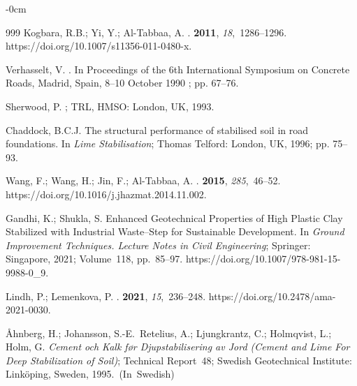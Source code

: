 \documentclass[materials,article,accept,pdftex,moreauthors]{Definitions/mdpi}
\begin{document}
\begin{adjustwidth}{-\extralength}{0cm}
\begin{thebibliography}{999}
Kogbara, R.B.; Yi, Y.; Al-Tabbaa, A.
.
 {\bf 2011}, {\em
  18},~1286--1296. https://doi.org/10.1007/s11356-011-0480-x.

{Verhasselt, V.} 
.
\newblock  In Proceedings of the 6th International Symposium on Concrete Roads, {Madrid, Spain}, {8--10 October 1990}
; pp. 67--76.

Sherwood, P.
; TRL, HMSO: London, UK,
   1993.

Chaddock, B.C.J. {The structural performance of stabilised soil in road
  foundations}.
\newblock In {\em {Lime Stabilisation}}; Thomas Telford: London, UK,  1996; pp.
  75--93.

Wang, F.; Wang, H.; Jin, F.; Al-Tabbaa, A.
.
 {\bf 2015}, {\em 285},~46--52. https://doi.org/10.1016/j.jhazmat.2014.11.002.

Gandhi, K.; Shukla, S.  {Enhanced Geotechnical Properties of High Plastic Clay
  Stabilized with Industrial Waste–Step for Sustainable Development.}
\newblock In {\em {Ground Improvement Techniques. Lecture Notes in Civil
  Engineering}}; Springer: Singapore,  2021; \mbox{Volume 118,} pp.~85--97. https://doi.org/10.1007/978-981-15-9988-0\_9.

Lindh, P.; Lemenkova, P.
.
 {\bf 2021}, {\em 15},~236--248. https://doi.org/10.2478/ama-2021-0030.

\r{A}hnberg, H.; Johansson, S.-E.~Retelius, A.; Ljungkrantz, C.; Holmqvist, L.;
  Holm, G.
\newblock \emph{Cement och Kalk f{\o}r Djupstabilisering av Jord (Cement and Lime For
  Deep Stabilization of Soil)};
\newblock Technical Report~48; Swedish Geotechnical Institute: Linköping,
  Sweden,  1995.\mbox{ (In Swedish)}


\end{thebibliography}
\end{adjustwidth}
\end{document}

